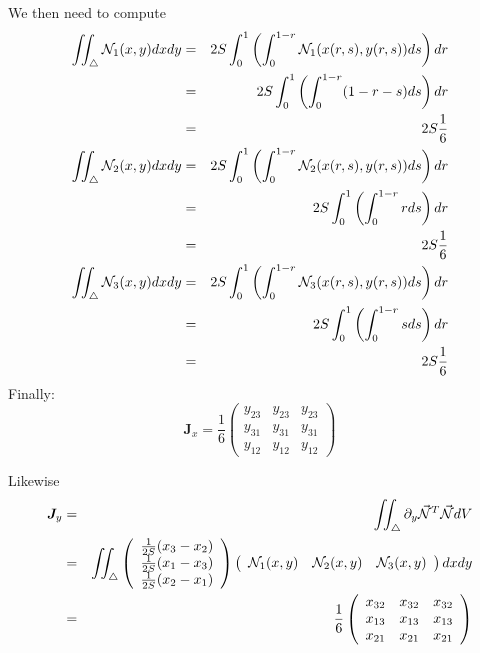 We then need to compute
\begin{eqnarray}
\iint_\triangle {\mathcal{N}}_1(x,y) dx dy 
&=& 2S \int_0^{1} \left(\int_0^{1-r} {\mathcal{N}}_1(x(r,s),y(r,s))  ds \right) dr \nonumber\\ 
&=& 2S \int_0^{1} \left(\int_0^{1-r} (1-r-s)  ds \right) dr \nonumber\\ 
&=& 2S \frac{1}{6} \label{eq:elmats:1}\\ 
\iint_\triangle {\mathcal{N}}_2(x,y) dx dy 
&=& 2S \int_0^{1} \left(\int_0^{1-r} {\mathcal{N}}_2(x(r,s),y(r,s))  ds \right) dr \nonumber\\ 
&=& 2S \int_0^{1} \left(\int_0^{1-r} r  ds \right) dr \nonumber\\ 
&=& 2S \frac{1}{6} \label{eq:elmats:2}\\ 
\iint_\triangle {\mathcal{N}}_3(x,y) dx dy 
&=& 2S \int_0^{1} \left(\int_0^{1-r} {\mathcal{N}}_3(x(r,s),y(r,s))  ds \right) dr \nonumber\\ 
&=& 2S \int_0^{1} \left(\int_0^{1-r} s  ds \right) dr \nonumber\\ 
&=& 2S \frac{1}{6} \label{eq:elmats:3} 
\end{eqnarray}
Finally:
\[
{\bm J}_x
=
\frac{1}{6}
\left(
\begin{array}{ccc}
y_{23} & y_{23} & y_{23} \\ 
y_{31} & y_{31} & y_{31} \\ 
y_{12} & y_{12} & y_{12}  
\end{array}
\right) 
\]

Likewise
\begin{eqnarray}
{\bm J}_y
&=& \iint_\triangle  \partial_y \vec{{\mathcal{N}}}^T \vec{{\mathcal{N}}} dV \nonumber\\
&=&  \iint_\triangle 
\left(
\begin{array}{c}
\frac{1}{2S}(x_3-x_2) \\
\frac{1}{2S}(x_1-x_3) \\
\frac{1}{2S}(x_2-x_1)
\end{array}
\right)
\left(
\begin{array}{ccc}
{\mathcal{N}}_1(x,y) & {\mathcal{N}}_2(x,y) & {\mathcal{N}}_3(x,y) 
\end{array}
\right) dx dy \nonumber\\
&=&
\frac{1}{6}
\left(
\begin{array}{ccc}
x_{32} & x_{32} & x_{32} \\ 
x_{13} & x_{13} & x_{13} \\ 
x_{21} & x_{21} & x_{21}  
\end{array}
\right) 
\end{eqnarray}

